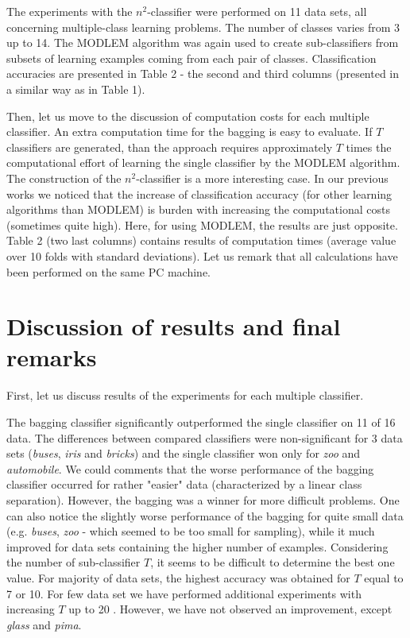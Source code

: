 \documentclass{llncs}
\begin{document}
The experiments with the $n^2$-classifier were performed on 11 data sets,
all concerning multiple-class learning problems. The number of classes
varies from 3 up to 14. The MODLEM algorithm was again used to create
sub-classifiers from subsets of learning examples coming from each pair of
classes. Classification accuracies are presented in Table 2 - the second and
third columns (presented in a similar way as in Table 1).

Then, let us move to the discussion of computation costs for each multiple
classifier. An extra computation time for the bagging is easy to evaluate.
If $T$ classifiers are generated, than the approach requires approximately
$T$ times the computational effort of learning the single classifier by the
MODLEM algorithm. The construction of the $n^2$-classifier is a more
interesting case. In our previous works \cite{JelStef98,JelStef01} we
noticed that the increase of classification accuracy (for other learning
algorithms than MODLEM) is burden with increasing the computational costs
(sometimes quite high). Here, for using MODLEM, the results are just
opposite. Table 2 (two last columns) contains results of computation times
(average value over 10 folds with standard deviations). Let us remark that
all calculations have been performed on the same PC machine.


\section{Discussion of results and final remarks}

First, let us discuss results of the experiments for each multiple
classifier.

The bagging classifier significantly outperformed the single classifier on
11 of 16 data. The differences between compared classifiers were
non-significant for 3 data sets (\emph{buses}, \emph{iris} and
\emph{bricks}) and the single classifier won only for {\em zoo} and {\em
automobile}. We could comments that the worse performance of the bagging
classifier occurred for rather "easier" data (characterized by a linear
class separation). However, the bagging was a winner for more difficult
problems. One can also notice the slightly worse performance of the bagging
for quite small data (e.g. \emph{ buses}, \emph{zoo} - which seemed to be
too small for sampling), while it much improved for data sets containing the
higher number of examples. Considering the number of sub-classifier $T$, it
seems to be difficult to determine the best one value. For majority of data
sets, the highest accuracy was obtained for $T$ equal to 7 or 10. For few
data set we have performed additional experiments with increasing $T$ up to
20 \cite{Ste02}. However, we have not observed an improvement, except
\emph{glass} and \emph{pima}.
\end{document}
